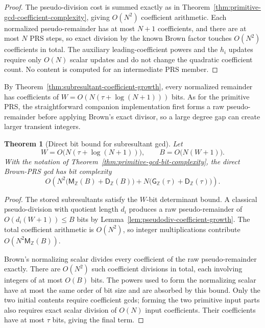 \documentclass[11pt]{book}
\newtheorem{theorem}{Theorem}[section]
\theoremstyle{definition}
\newcommand{\ZZ}{\mathbb Z}
\newcommand{\MZ}{\mathsf M_{\ZZ}}
\begin{document}
\begin{proof}
The pseudo-division cost is summed exactly as in
Theorem~\ref{thm:primitive-gcd-coefficient-complexity}, giving $O(N^2)$
coefficient arithmetic.  Each normalized pseudo-remainder has at most $N+1$
coefficients, and there are at most $N$ PRS steps, so exact division by the
known Brown factor touches $O(N^2)$ coefficients in total.  The auxiliary
leading-coefficient powers and the $h_i$ updates require only $O(N)$ scalar
updates and do not change the quadratic coefficient count.  No content is
computed for an intermediate PRS member.
\end{proof}

By Theorem~\ref{thm:subresultant-coefficient-growth}, every normalized remainder
has coefficients of $W=O(N(\tau+\log(N+1)))$ bits.  As for the primitive PRS,
the straightforward companion implementation first forms a raw
pseudo-remainder before applying Brown's exact divisor, so a large degree gap
can create larger transient integers.

\begin{theorem}[Direct bit bound for subresultant gcd]
\label{thm:subresultant-gcd-bit-complexity}
Let
\[
 W=O\bigl(N(\tau+\log(N+1))\bigr),
 \qquad
 B=O\bigl(N(W+1)\bigr).
\]
With the notation of
Theorem~\ref{thm:primitive-gcd-bit-complexity}, the direct Brown-PRS gcd has bit
complexity
\begin{equation}\label{eq:subresultant-gcd-bit-complexity}
 O\!\left(
 N^2\bigl(\MZ(B)+\mathsf D_{\ZZ}(B)\bigr)
 +N\bigl(\mathsf G_{\ZZ}(\tau)+\mathsf D_{\ZZ}(\tau)\bigr)
 \right).
\end{equation}
\end{theorem}

\begin{proof}
The stored subresultants satisfy the $W$-bit determinant bound.  A classical
pseudo-division with quotient length $d_i$ produces a raw pseudo-remainder of
$O(d_i(W+1))\le B$ bits by
Lemma~\ref{lem:pseudodiv-coefficient-growth}.  The total coefficient arithmetic
is $O(N^2)$, so integer multiplications contribute
$O(N^2\MZ(B))$.

Brown's normalizing scalar divides every coefficient of the raw
pseudo-remainder exactly.  There are $O(N^2)$ such coefficient divisions in
total, each involving integers of at most $O(B)$ bits.  The powers used to form
the normalizing scalar have at most the same order of bit size and are absorbed
by this bound.  Only the two initial contents require coefficient gcds; forming the two
primitive input parts also requires exact scalar division of $O(N)$ input
coefficients.  Their coefficients have at most $\tau$ bits, giving the final
term.
\end{proof}
\end{document}
